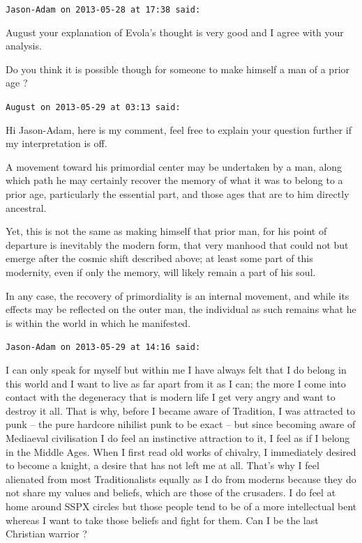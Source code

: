 \begin{footnotesize}
\begin{sffamily}
\hfill

\texttt{Jason-Adam on 2013-05-28 at 17:38 said: }

August your explanation of Evola's thought is very good and I agree with your analysis. 

Do you think it is possible though for someone to make himself a man of a prior age ?


\hfill

\texttt{August on 2013-05-29 at 03:13 said: }

Hi Jason-Adam, here is my comment, feel free to explain your question further if my interpretation is off.

A movement toward his primordial center may be undertaken by a man, along which path he may certainly recover the memory of what it was to belong to a prior age, particularly the essential part, and those ages that are to him directly ancestral.

Yet, this is not the same as making himself that prior man, for his point of departure is inevitably the modern form, that very manhood that could not but emerge after the cosmic shift described above; at least some part of this modernity, even if only the memory, will likely remain a part of his soul.

In any case, the recovery of primordiality is an internal movement, and while its effects may be reflected on the outer man, the individual as such remains what he is within the world in which he manifested.


\hfill

\texttt{Jason-Adam on 2013-05-29 at 14:16 said: }

I can only speak for myself but within me I have always felt that I do belong in this world and I want to live as far apart from it as I can; the more I come into contact with the degeneracy that is modern life I get very angry and want to destroy it all. That is why, before I became aware of Tradition, I was attracted to punk – the pure hardcore nihilist punk to be exact – but since becoming aware of Mediaeval civilisation I do feel an instinctive attraction to it, I feel as if I belong in the Middle Ages. When I first read old works of chivalry, I immediately desired to become a knight, a desire that has not left me at all. That's why I feel alienated from most Traditionalists equally as I do from moderns because they do not share my values and beliefs, which are those of the crusaders. I do feel at home around SSPX circles but those people tend to be of a more intellectual bent whereas I want to take those beliefs and fight for them. Can I be the last Christian warrior ?



\end{sffamily}
\end{footnotesize}
